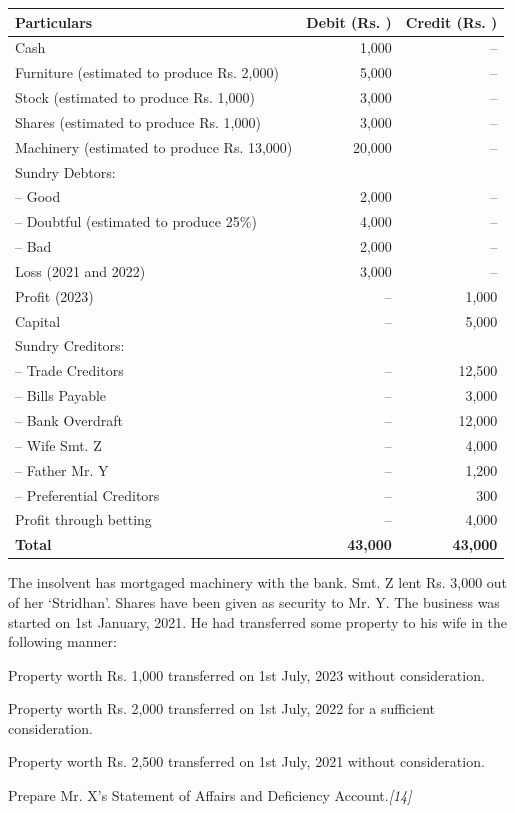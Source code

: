 \documentclass[11pt,a4paper]{article}
\newcommand{\pts}[1]{\hfill   \textit{[#1]}}
\begin{document}
\begin{center}
\small

\begin{tabular}{|l|r|r|}
\hline
   \textbf{Particulars} &   \textbf{Debit (Rs. )} &   \textbf{Credit (Rs. )} \\
\hline
Cash & 1,000 & -- \\
Furniture (estimated to produce Rs. 2,000) & 5,000 & -- \\
Stock (estimated to produce Rs. 1,000) & 3,000 & -- \\
Shares (estimated to produce Rs. 1,000) & 3,000 & -- \\
Machinery (estimated to produce Rs. 13,000) & 20,000 & -- \\
Sundry Debtors: & & \\
\quad -- Good & 2,000 & -- \\
\quad -- Doubtful (estimated to produce 25\%) & 4,000 & -- \\
\quad -- Bad & 2,000 & -- \\
Loss (2021 and 2022) & 3,000 & -- \\
Profit (2023) & -- & 1,000 \\
Capital & -- & 5,000 \\
Sundry Creditors: & & \\
\quad -- Trade Creditors & -- & 12,500 \\
\quad -- Bills Payable & -- & 3,000 \\
\quad -- Bank Overdraft & -- & 12,000 \\
\quad -- Wife Smt. Z & -- & 4,000 \\
\quad -- Father Mr. Y & -- & 1,200 \\
\quad -- Preferential Creditors & -- & 300 \\
Profit through betting & -- & 4,000 \\
\hline
   \textbf{Total} &   \textbf{43,000} &   \textbf{43,000} \\
\hline
\end{tabular}
\end{center}

The insolvent has mortgaged machinery with the bank. Smt. Z lent Rs. 3,000 out of her `Stridhan'. Shares have been given as security to Mr. Y. The business was started on 1st January, 2021. He had transferred some property to his wife in the following manner:

\begin{parts}
  \item Property worth Rs. 1,000 transferred on 1st July, 2023 without consideration.
  \item Property worth Rs. 2,000 transferred on 1st July, 2022 for a sufficient consideration.
  \item Property worth Rs. 2,500 transferred on 1st July, 2021 without consideration.
\end{parts}
Prepare Mr. X's Statement of Affairs and Deficiency Account.\pts{14}
\end{document}
